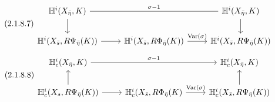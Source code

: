 \begin{equation}\tag{2.1.8.7}
\begin{tikzcd}
\mathbb{H}^i(X_{\bar{\eta}}, K) \arrow[rr, dash, "\sigma-1"] \arrow[d] & {} & \mathbb{H}^i(X_{\bar{\eta}}, K) \arrow[d] \\
\mathbb{H}^i(X_{\bar{s}}, R\Psi_{\bar{\eta}}(K)) \arrow[r] & \mathbb{H}^i(X_{\bar{s}}, R\Phi_{\bar{\eta}}(K)) \arrow[r, "\mathrm{Var}(\sigma)"] & \mathbb{H}^i(X_{\bar{s}}, R\Psi_{\bar{\eta}}(K))
\end{tikzcd}
\end{equation}
\begin{equation}\tag{2.1.8.8}
\begin{tikzcd}
\mathbb{H}^i_c(X_{\bar{\eta}}, K) \arrow[rr, "\sigma-1"] & {} & \mathbb{H}^i_c(X_{\bar{\eta}}, K) \\
\mathbb{H}^i_c(X_s, R\Psi_{\bar{\eta}}(K)) \arrow[r] \arrow[u] & \mathbb{H}^i_c(X_{\bar{s}}, R\Phi_{\bar{\eta}}(K) \arrow[r, "\mathrm{Var}(\sigma)"] & \mathbb{H}^i_c(X_{\bar{s}}, R\Psi_{\bar{\eta}}(K)) \arrow[u]
\end{tikzcd}
\end{equation}
